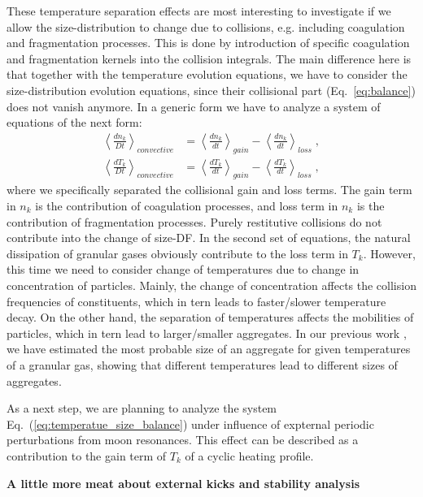 \documentclass[11pt, notitlepage]{article} %
\begin{document}
These temperature separation effects are most interesting to investigate if we allow the size-distribution
to change due to collisions, e.g. including coagulation and fragmentation processes. This is done by introduction
of specific coagulation and fragmentation kernels into the collision integrals. The main difference here is 
that together with the temperature evolution equations, we have to consider the size-distribution evolution equations,
since their collisional part (Eq.~\ref{eq:balance}) does not vanish anymore. In a generic form we have to analyze a
system of equations of the next form:
\begin{equation}\label{eq:temperatue_size_balance}
	\begin{split}
		\left\langle\frac{dn_k}{Dt}\right\rangle_{convective} &= \left\langle\frac{dn_k}{dt}\right\rangle_{gain}-\left\langle\frac{dn_k}{dt}\right\rangle_{loss}\;,\\
		\left\langle\frac{dT_k}{Dt}\right\rangle_{convective} &= \left\langle\frac{dT_k}{dt}\right\rangle_{gain}-\left\langle\frac{dT_k}{dt}\right\rangle_{loss}\;,
	\end{split}
\end{equation}
where we specifically separated the collisional gain and loss terms. The gain term in $n_k$ is the contribution of coagulation
processes, and loss term in $n_k$ is the contribution of fragmentation processes. Purely restitutive collisions do not 
contribute into the change of size-DF. In the second set of equations, the natural dissipation of granular gases obviously 
contribute to the loss term in $T_k$. However, this time we need to consider change of temperatures due to change in concentration
of particles. Mainly, the change of concentration affects the collision frequencies of constituents, which in tern leads to 
faster/slower temperature decay. On the other hand, the separation of temperatures affects the mobilities of particles, which in 
tern lead to larger/smaller aggregates. In our previous work \citep{baibolatov2012}, we have estimated the most probable 
size of an aggregate for given temperatures of a granular gas, showing that different temperatures lead to different sizes of 
aggregates.

As a next step, we are planning to analyze the system Eq.~(\ref{eq:temperatue_size_balance}) under influence of expternal
periodic perturbations from moon resonances. This effect can be described as a contribution to the gain term of $T_k$ 
of a cyclic heating profile. 

\textbf{A little more meat about external kicks and stability analysis}
\end{document}
